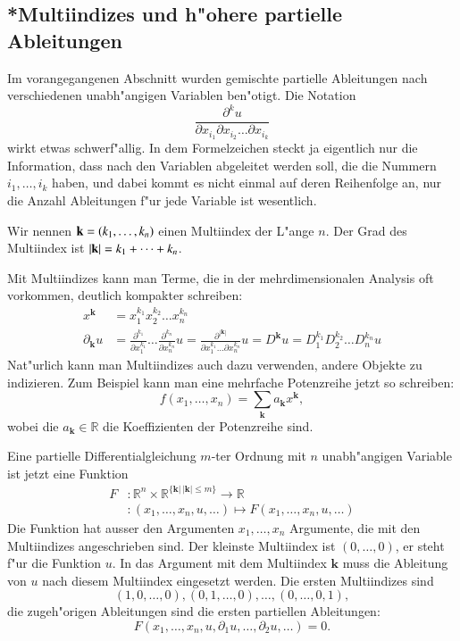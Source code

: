 \subsection{*Multiindizes und h"ohere partielle Ableitungen\label{klassifikation:multiindizes}}
Im vorangegangenen Abschnitt wurden gemischte partielle Ableitungen
nach verschiedenen unabh"angigen Variablen ben"otigt. Die Notation
\[
\frac{\partial^k u}{\partial x_{i_1}\partial x_{i_2}\dots\partial x_{i_k}}
\]
wirkt etwas schwerf"allig. In dem Formelzeichen steckt ja eigentlich
nur die Information, dass nach den Variablen abgeleitet werden
soll, die die Nummern $i_1,\dots,i_k$ haben, und dabei kommt es
nicht einmal auf deren Reihenfolge an, nur die Anzahl Ableitungen
f"ur jede Variable ist wesentlich.
\begin{definition}
Wir nennen ${\bf k}=(k_1,\dots,k_n)$ einen Multiindex der L"ange $n$.
Der Grad des Multiindex ist $|{\bf k}|=k_1+\dots+k_n$.
\end{definition}
Mit Multiindizes kann man Terme, die in der mehrdimensionalen
Analysis oft vorkommen, deutlich kompakter schreiben:
\begin{align*}
x^{\mathbf k}&=x_1^{k_1}x_2^{k_2}\dots x_n^{k_n}\\
\partial_{\mathbf k}u
&=\frac{\partial^{k_1}}{\partial x_1^{k_1}}\dots
\frac{\partial^{k_n}}{\partial x_n^{k_n}}u
=\frac{\partial^{|{\mathbf k}|}}{\partial x_1^{k_1}\dots\partial x_n^{k_n}}u
=D^{\mathbf k}u=D_1^{k_1}D_2^{k_2}\dots D_n^{k_n}u
\end{align*}
Nat"urlich kann man Multiindizes auch dazu verwenden, andere 
Objekte zu indizieren. Zum Beispiel kann man eine mehrfache Potenzreihe
jetzt so schreiben:
\[
f(x_1,\dots,x_n)=\sum_{\mathbf k}a_{\mathbf k}x^{\mathbf k},
\]
wobei die $a_{\mathbf k}\in\mathbb R$ die Koeffizienten der Potenzreihe sind.

Eine partielle Differentialgleichung $m$-ter Ordnung mit $n$ unabh"angigen 
Variable ist jetzt eine Funktion
\begin{align*}
F&\colon \mathbb R^n\times \mathbb R^{\{{\mathbf k}|\,|{\mathbf k}|\le m\}} \to \mathbb R
\\
&\colon(x_1,\dots,x_n,u, \dots)\mapsto F(x_1,\dots,x_n,u,\dots)
\end{align*}
Die Funktion hat ausser den Argumenten $x_1,\dots,x_n$ Argumente,
die mit den Multiindizes angeschrieben sind. Der kleinste Multiindex
ist $(0,\dots,0)$, er steht f"ur die Funktion $u$. In das Argument mit
dem Multiindex ${\mathbf k}$ muss die Ableitung von $u$ nach diesem
Multiindex eingesetzt werden. Die ersten Multiindizes sind
\[
(1,0,\dots,0), (0,1,\dots,0),\dots, (0,\dots, 0,1),
\]
die zugeh"origen Ableitungen sind die
ersten partiellen Ableitungen:
\[
F(x_1,\dots,x_n,u,\partial_1 u,\dots,\partial_2 u,\dots)=0.
\]

